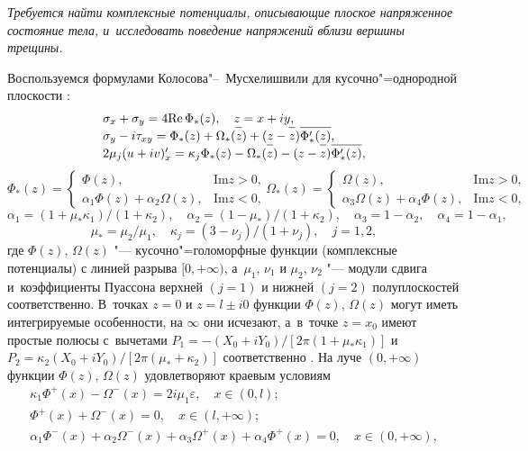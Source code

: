 \smallskip
{\it Требуется найти комплексные потенциалы, описывающие плоское напряженное состояние тела, и~исследовать поведение напряжений вблизи вершины трещины.}

\smallskip

Воспользуемся формулами Колосова"--~Мусхелишвили для кусочно"=однородной плоскости \cite{vas-sil:bib:Cherepanov}:
\begin{equation}
\begin{array}{l}
 \sigma_{x}+\sigma_{y}=4\mbox{Re\,}\Phi_*(z),\quad  z=x+iy,\\
 \sigma_y-i\tau_{xy}=\Phi_*(z)+\Omega_*(\overline{\strut z})+(z-\overline{\strut z})\overline{\strut\Phi'_*(z)},\\
 2\mu_j(u+iv)'_x=\kappa_j\Phi_*(z)-\Omega_*(\overline{\strut z})-(z-\overline{\strut z})\overline{\strut \Phi'_*(z)},
\end{array} \label{eq:vas-sil:Kol-Muskh}
\end{equation}
$$
\Phi_*(z)=
\left\{
   \begin{array}{cl}
        \Phi(z), &\text{$\mbox{Im}z>0$,}  \\
        \alpha_1\Phi(z)+ \alpha_2\Omega(z), & \text{$\mbox{Im}z<0$,}
   \end{array}
\right.     
      \Omega_*(z)=
\left\{
   \begin{array}{cl}
        \Omega(z), & \text{$\mbox{Im}z>0$,}  \\
        \alpha_3\Omega(z)+ \alpha_4\Phi(z), & \text{$\mbox{Im}z<0$,}
   \end{array}
\right. 
$$   
$$
\alpha_1=(1+\mu_*\kappa_1)/(1+\kappa_2),\quad  \alpha_2=(1-\mu_*)/(1+\kappa_2),\quad \alpha_3=1-\alpha_2,\quad \alpha_4=1-\alpha_1,$$
$$\mu_*=\mu_2/\mu_1,\quad  \kappa_j=(3-\nu_j)/(1+\nu_j),\quad  j=1, 2,$$
где $\Phi(z)$, $\Omega(z)$ "--- кусочно"=голоморфные функции (комплексные потенциалы) с линией разрыва $[0,+\infty)$, 
а~$\mu_1$, $\nu_1$ и $\mu_2$, $\nu_2$ "--- модули сдвига и~коэффициенты Пуассона верхней $(j=1)$ и нижней $(j=2)$ полуплоскостей соответственно. 
В~точках $z=0$ и $z=l\pm i0$ функции $\Phi(z)$, $\Omega(z)$  могут иметь интегрируемые особенности, на $\infty$ они исчезают, а~в~точке $z=x_0$ имеют простые полюсы с~вычетами $P_1=-(X_0+iY_0)/[2\pi (1+\mu_*\kappa_1)]$  и  \mbox{$P_2=\kappa_2(X_0+iY_0)/[2\pi (\mu_*+\kappa_2)]$} соответственно \cite{vas-sil:bib:Silvestrov}. 
На луче $(0,+\infty)$  функции  $\Phi(z)$, $\Omega(z)$ удовлетворяют краевым условиям
\begin{equation}
\begin{array}{l}
   \kappa_1\Phi^{+}(x)-\Omega^{-}(x) =2i\mu_1\varepsilon,\quad  x\in(0, l); \\ \Phi^{+}(x)+\Omega^{-}(x) =0,\quad  x\in(l,+\infty);\\
 \alpha_1\Phi^{-}(x)+\alpha_2\Omega^{-}(x)+ \alpha_3\Omega^{+}(x)+\alpha_4\Phi^{+}(x)=0,\quad  x\in(0,+\infty),
\end{array} \label{eq:vas-sil:BoundaryCond}
\end{equation}
